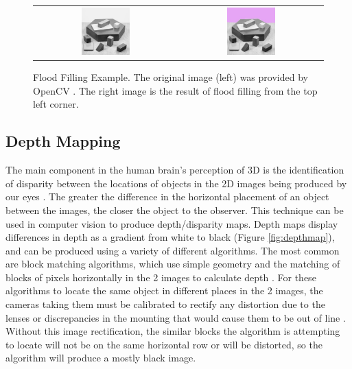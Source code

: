 \begin{figure}[H]
    \begin{center}
    \begin{tabular}{ c c }
        \includegraphics[width=0.35\textwidth]{Figures/blox.jpg} &
        \includegraphics[width=0.35\textwidth]{Figures/bloxFilled.jpg}
    \end{tabular}
    \caption[Flood Filling Example]{Flood Filling Example. The original image (left) was provided by OpenCV \cite{OpenCV}. The right image is the result of flood filling from the top left corner.}
    \label{fig:EgFloodFill}
    \end{center}
\end{figure}

\subsection{Depth Mapping}
\label{subsection:depth}

The main component in the human brain's perception of 3D is the identification of disparity between the locations of objects in the 2D images being produced by our eyes \cite{qian1997binocular}. The greater the difference in the horizontal placement of an object between the images, the closer the object to the observer. This technique can be used in computer vision to produce depth/disparity maps. Depth maps display differences in depth as a gradient from white to black (Figure \ref{fig:depthmap}), and can be produced using a variety of different algorithms. The most common are block matching algorithms, which use simple geometry and the matching of blocks of pixels horizontally in the 2 images to calculate depth \cite{linda2001stockman}. For these algorithms to locate the same object in different places in the 2 images, the cameras taking them must be calibrated to rectify any distortion due to the lenses \cite{distort} or discrepancies in the mounting that would cause them to be out of line \cite{stereocal}. Without this image rectification, the similar blocks the algorithm is attempting to locate will not be on the same horizontal row or will be distorted, so the algorithm will produce a mostly black image.

